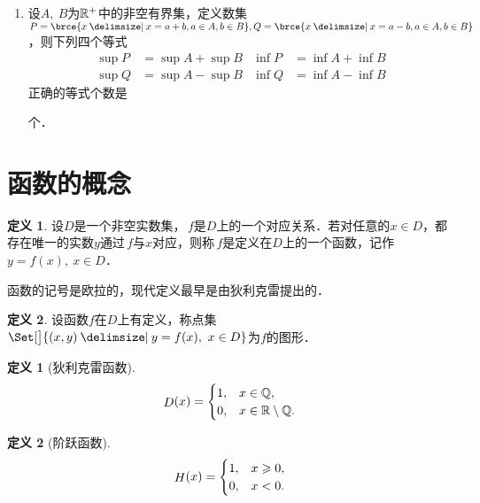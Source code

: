 \documentclass[a4paper,punct=CCT]{ctexbook}
\theoremstyle{definition}
\newtheorem{definition}{定义}
\newtheorem*{definition*}{定义}
\theoremstyle{remark}
\newif\ifshowsol
\let\geq\geqslant
\let\ge\geq}
\begin{document}
\begin{enumerate}
\item 设\(A,\ B\)为\(\mathbb{R}^+\)中的非空有界集，定义数集\(P = \brce{x \mid x = a + b, a \in A, b \in B}, Q = \brce{x \mid x = a - b, a \in A, b \in B}\)，则下列四个等式
  \begin{align*}
    \sup P &= \sup A + \sup B & \inf P &= \inf A + \inf B \\
    \sup Q &= \sup A - \sup B & \inf Q &= \inf A - \inf B
  \end{align*}
  正确的等式个数是
  \ifshowsol
  \uline{\makebox[4em]{\(2\)}}%
  \else
  \uline{\makebox[4em]{}}%
  \fi
  个．

  \ifshowsol
  前两个等式是正确的，后两个改成\(\sup Q = \sup A - \inf B\)和\(\inf Q = \inf A - \sup B\)就正确了．
  \fi
\end{enumerate}
\fi

\section{函数的概念}

\begin{definition*}
  设\(D\)是一个非空实数集，\(\,f\)是\(D\)上的一个对应关系．若对任意的\(x \in D\)，都存在唯一的实数\(y\)通过\(\,f\)与\(x\)对应，则称\(\,f\)是定义在\(D\)上的一个函数，记作\(y = f(x),\ x \in D\)．
\end{definition*}

函数的记号是欧拉的，现代定义最早是由狄利克雷提出的．

\begin{definition*}
  设函数\(f\)在\(D\)上有定义，称点集\(\Set[\big]{(x,y) \mid y = f(x),\ x \in D}\)为\(f\)的图形．
\end{definition*}

\begin{definition}[狄利克雷函数]
  \label{defn:dirichlet}
  \[
    \mathop{\relax D}\nolimits(x) =
    \begin{cases}
      1, & x \in \mathbb{Q}, \\
      0, & x \in \mathbb{R} \setminus \mathbb{Q}.
    \end{cases}
  \]
\end{definition}

\begin{definition}[阶跃函数]
  \label{defn:heaviside}
  \[
    \Fn H(x) =
    \begin{cases}
      1, & x \ge 0, \\
      0, & x < 0.
    \end{cases}
  \]
\end{definition}
\end{document}
